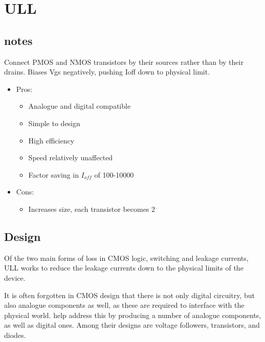 \section{\acf{ULL}}
\label{sec:ull}

\subsection{notes}

Connect PMOS and NMOS transistors by their sources rather than by their drains.
Biases Vgs negatively, pushing Ioff down to physical limit.


\begin{itemize}

\item Pros:

\begin{itemize}

\item Analogue and digital compatible
\item Simple to design
\item High efficiency
\item Speed relatively unaffected
\item Factor saving in $I_{off}$ of 100-10000 \cite{ULL-AandD}

\end{itemize}

\item Cons:

\begin{itemize}

\item Increases size, each transistor becomes 2 \cite{ULL-AandD}

\end{itemize}

\end{itemize}

\subsection{Design}

Of the two main forms of loss in CMOS logic, switching and leakage currents, \ac{ULL} works to reduce the leakage currents down to the physical limits of the device.

It is often forgotten in CMOS design that there is not only digital circuitry, but also analogue components as well, as these are required to interface with the physical world.
\citeauthor{ULL-AandD} help address this by producing a number of analogue components, as well as digital ones.
Among their designs are voltage followers, transistors, and diodes.

